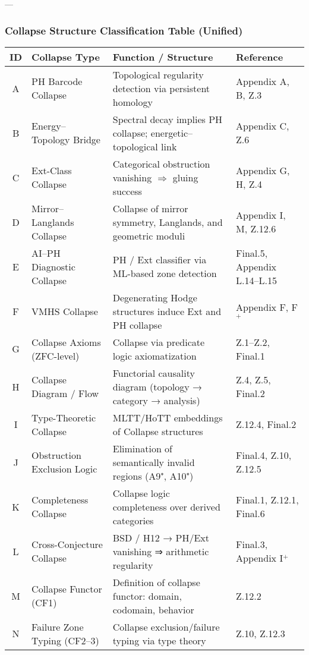 \documentclass[11pt]{article}
\begin{document}
\begin{axiom}
\begin{axiom}
{{---

\subsubsection*{Collapse Structure Classification Table (Unified)}

\begin{center}
\renewcommand{\arraystretch}{1.4}
\setlength{\tabcolsep}{4pt}
\begin{tabularx}{\textwidth}{|c|X|X|X|}
\hline
\textbf{ID} & \textbf{Collapse Type} & \textbf{Function / Structure} & \textbf{Reference} \\
\hline
A & PH Barcode Collapse & Topological regularity detection via persistent homology & Appendix A, B, Z.3 \\
B & Energy–Topology Bridge & Spectral decay implies PH collapse; energetic–topological link & Appendix C, Z.6 \\
C & Ext-Class Collapse & Categorical obstruction vanishing $\Rightarrow$ gluing success & Appendix G, H, Z.4 \\
D & Mirror–Langlands Collapse & Collapse of mirror symmetry, Langlands, and geometric moduli & Appendix I, M, Z.12.6 \\
E & AI–PH Diagnostic Collapse & PH / Ext classifier via ML-based zone detection & Final.5, Appendix L.14–L.15 \\
F & VMHS Collapse & Degenerating Hodge structures induce Ext and PH collapse & Appendix F, F$^+$ \\
G & Collapse Axioms (ZFC-level) & Collapse via predicate logic axiomatization & Z.1–Z.2, Final.1 \\
H & Collapse Diagram / Flow & Functorial causality diagram (topology → category → analysis) & Z.4, Z.5, Final.2 \\
I & Type-Theoretic Collapse & MLTT/HoTT embeddings of Collapse structures & Z.12.4, Final.2 \\
J & Obstruction Exclusion Logic & Elimination of semantically invalid regions (A9⁺, A10⁺) & Final.4, Z.10, Z.12.5 \\
K & Completeness Collapse & Collapse logic completeness over derived categories & Final.1, Z.12.1, Final.6 \\
L & Cross-Conjecture Collapse & BSD / H12 → PH/Ext vanishing ⇒ arithmetic regularity & Final.3, Appendix I$^+$ \\
M & Collapse Functor (CF1) & Definition of collapse functor: domain, codomain, behavior & Z.12.2 \\
N & Failure Zone Typing (CF2–3) & Collapse exclusion/failure typing via type theory & Z.10, Z.12.3 \\

\end{tabularx}
\end{center}}}
\end{axiom}
\end{axiom}
\end{document}
